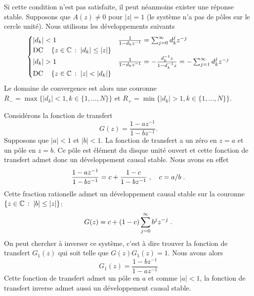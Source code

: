 Si cette condition n'est pas satisfaite, il peut néanmoins exister une réponse stable. Supposons que $A(z) \ne 0$ pour $|z|=1$ (le système n'a pas de pôles sur le cercle unité). Nous utilisons les développements suivants
\begin{equation}
\label{eq:developpement-pole}
\begin{cases}
|d_k| < 1 & \frac{1}{1-d_k z^{-1}}= \sum_{j=0}^\infty d_k^j z^{-j} \\
 \mathrm{DC} \quad \left\{ z \in \mathbb{C}\,:\; |d_k| \leq |z|\right\} \\
|d_k| > 1 & \frac{1}{1-d_k z^{-1}}= - \frac{d_k^{-1} z}{1 - d_k^{-1} z} = - \sum_{j=1}^\infty d_k^j z^{-j} \\
 \mathrm{DC} \quad \left\{z \in \mathbb{C}\,:\; |z| < |d_k|\right\}
\end{cases}
\end{equation}
Le domaine de convergence est alors une couronne $R_- = \max \{ |d_k| < 1, k \in \{1, \dots, N\} \}$ et $R_+= \min \{ |d_k| > 1, k \in \{1, \dots, N\} \}$.
\begin{example}
Considérons la fonction de transfert
\[
G(z)= \frac{1-az^{-1}}{1-bz^{-1}} .
\]
Supposons que $|a| < 1$ et $|b| < 1$. La fonction de transfert a un zéro en $z=a$ et un pôle en $z=b$. Ce pôle est élément du disque unité ouvert et cette fonction de transfert admet donc un développement causal stable. Nous avons en effet
\[
\frac{1-az^{-1}}{1-bz^{-1}} = c + \frac{1-c}{1-b z^{-1}} \;, \quad c= a/b \;.
\]
Cette fraction rationelle admet un développement causal stable sur la couronne $\left\{z \in \mathbb{C}\,:\; |b| \leq |z|\right\}$:
\[
G(z) = c + (1-c) \sum_{j=0}^\infty b^j z^{-j} \;.
\]
On peut chercher à inverser ce système, c'est à dire trouver la fonction de transfert $G_1(z)$ qui soit telle que $G(z) G_1(z)= 1$.
Nous avons alors
\[
G_1(z)= \frac{1-bz^{-1}}{1-a z^{-1}}
\]
Cette fonction de transfert admet un pôle en $a$ et comme $|a| < 1$, la fonction de transfert inverse admet aussi un développement causal stable.
\end{example}
